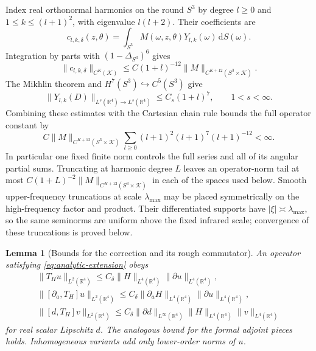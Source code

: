 \documentclass[11pt,a4paper]{article}
\numberwithin{equation}{section}
\newcommand{\dd}{\mathrm d}
\newcommand{\R}{\mathbb R}
\newtheorem{lemma}[theorem]{Lemma}
\theoremstyle{definition}
\begin{document}
Index real orthonormal harmonics on the round $S^3$ by degree
$l\geq0$ and $1\leq k\leq(l+1)^2$, with eigenvalue $l(l+2)$.
Their coefficients are
\begin{equation*}
c_{l,k,\delta}(z,\theta)
=\int_{S^3}M(\omega,z,\theta)Y_{l,k}(\omega)\,\dd S(\omega).
\end{equation*}
Integration by parts with $(1-\Delta_{S^3})^6$ gives
\begin{equation*}
 \|c_{l,k,\delta}\|_{C^K(\mathcal K)}
 \leq C(1+l)^{-12}\|M\|_{C^{K+12}(S^3\times\mathcal K)}.
\end{equation*}
The Mikhlin theorem and $H^7(S^3)\hookrightarrow C^5(S^3)$ give
\begin{equation*}
 \|Y_{l,k}(D)\|_{L^s(\R^4)\to L^s(\R^4)}\leq C_s(1+l)^7,
 \qquad 1<s<\infty.
\end{equation*}
Combining these estimates with the Cartesian chain rule bounds the
full operator constant by
\begin{equation*}
 C\|M\|_{C^{K+12}(S^3\times\mathcal K)}
 \sum_{l\geq0}(l+1)^2(l+1)^7(l+1)^{-12}<\infty.
\end{equation*}
In particular one fixed finite norm controls the full series and all
of its angular partial sums. Truncating at harmonic degree $L$ leaves
an operator-norm tail at most $C(1+L)^{-2}\|M\|_{C^{K+12}(S^3\times\mathcal K)}$ in each
of the spaces used below. Smooth upper-frequency truncations at
scale $\lambda_{\max}$ may be placed symmetrically on the high-frequency
factor and product. Their differentiated supports have
$|\xi|\asymp\lambda_{\max}$, so the same seminorms are uniform above
the fixed infrared scale; convergence of these truncations is proved below.


\begin{lemma}[Bounds for the correction and its rough commutator]
\label{lem:analytic-correction-bounds}
An operator satisfying \eqref{eq:analytic-extension} obeys
\begin{equation}\label{eq:analytic-correction-bounds}
\begin{gathered}
\|T_Hu\|_{L^2(\R^4)}\leq C_\delta\|H\|_{L^4(\R^4)}\|\partial u\|_{L^4(\R^4)},\\
\|[\partial_a,T_H]u\|_{L^2(\R^4)}
\leq C_\delta\|\partial_aH\|_{L^4(\R^4)}\|\partial u\|_{L^4(\R^4)},\\
\|[d,T_H]v\|_{L^2(\R^4)}
\leq C_\delta\|\partial d\|_{L^{\infty}(\R^4)}\|H\|_{L^4(\R^4)}\|v\|_{L^4(\R^4)}
\end{gathered}
\end{equation}
for real scalar Lipschitz $d$. The analogous bound for the formal adjoint
pieces holds. Inhomogeneous variants add only lower-order norms of $u$.
\end{lemma}
\end{document}
